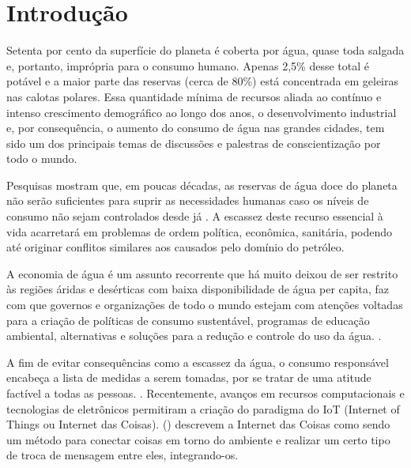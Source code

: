 \chapter[Introdução]{Introdução}

Setenta por cento da superfície do planeta é coberta por água, quase toda salgada e, portanto, imprópria para o consumo humano. Apenas 2,5\% desse total é potável e a maior parte das reservas (cerca de 80\%) está concentrada em geleiras nas calotas polares. 
Essa quantidade mínima de recursos aliada ao contínuo e intenso crescimento demográfico ao longo dos anos, o desenvolvimento industrial e, por consequência, o aumento do consumo de água nas grandes cidades, tem sido um dos principais temas de discussões e palestras de conscientização por todo o mundo. \cite{aguaconsumo}

Pesquisas mostram que, em poucas décadas, as reservas de água doce do planeta não serão suficientes para suprir as necessidades humanas caso os níveis de consumo não sejam controlados desde já \cite{Diarias2007}. A escassez deste recurso essencial à vida acarretará em problemas de ordem política, econômica, sanitária, podendo até originar conflitos similares aos causados pelo domínio do petróleo.

A economia de água é um assunto recorrente que há muito deixou de ser restrito às regiões áridas e desérticas com baixa disponibilidade de água per capita, faz com que governos e organizações de todo o mundo estejam com atenções voltadas para a criação de políticas de consumo sustentável, programas de educação ambiental, alternativas e soluções para a redução e controle do uso da água. \cite{ferreirasistema}.

A fim de evitar consequências como a escassez da água, o consumo
responsável encabeça a lista de medidas a serem tomadas, por se tratar de uma atitude factível a todas as pessoas. \cite{Diarias2007}. Recentemente, avanços em recursos computacionais e tecnologias de eletrônicos permitiram a criação do paradigma do IoT (Internet of Things ou Internet das Coisas). \citeauthor{Perumal2016} (\citeyear{Perumal2016}) descrevem a Internet das Coisas como sendo um método para conectar coisas em torno do ambiente e realizar um certo tipo de troca de mensagem entre eles, integrando-os.

